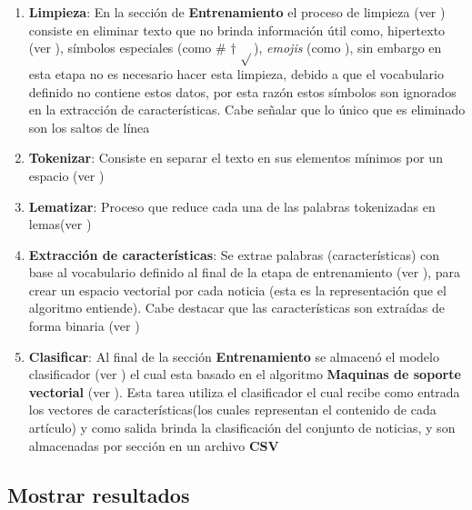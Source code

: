 \begin{enumerate}

	\item \textbf{Limpieza}: En la sección de \textbf{Entrenamiento} el proceso de limpieza (ver ) consiste en eliminar texto que no brinda información útil como, hipertexto (ver ), símbolos especiales (como \# $\dagger$ $\sqrt{ }$), \textit{emojis} (como \dSmiley \dCooley \dNinja), sin embargo en esta etapa no es necesario hacer esta limpieza, debido a que el vocabulario definido no contiene estos datos, por esta razón estos símbolos son ignorados en la extracción de características. Cabe señalar que lo único que es eliminado son los saltos de línea

	\item \textbf{Tokenizar}: Consiste en separar el texto en sus elementos mínimos por un espacio (ver )

	\item \textbf{Lematizar}: Proceso que reduce cada una de las palabras tokenizadas en lemas(ver )

	\item \textbf{Extracción de características}: Se extrae palabras (características) con base al vocabulario definido al final de la etapa de entrenamiento (ver ), para crear un espacio vectorial por cada noticia (esta es la representación que el algoritmo entiende). Cabe destacar que las características son extraídas de forma binaria (ver )

	\item \textbf{Clasificar}: Al final de la sección \textbf{Entrenamiento} se almacenó el modelo clasificador (ver ) el cual esta basado en el algoritmo \textbf{Maquinas de soporte vectorial} (ver ). Esta tarea utiliza el clasificador el cual recibe como entrada los vectores de características(los cuales representan el contenido de cada artículo) y como salida brinda la clasificación del conjunto de noticias, y son almacenadas por sección en un archivo \textbf{CSV}

\end{enumerate}


\subsection{Mostrar resultados}

